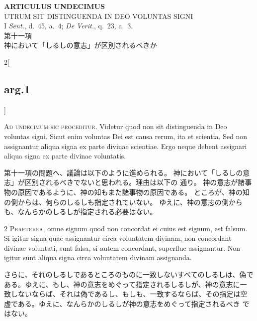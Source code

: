 \documentclass[paper=a4paper,fontsize=10pt,jafontsize=9pt,titlepage]{jlreq}
\begin{document}
{}
\setcounter{section}{11}
\setcounter{subsection}{0}
\begin{center}
 {\Large {\bfseries ARTICULUS UNDECIMUS}}\\
 {\large UTRUM SIT DISTINGUENDA IN DEO VOLUNTAS SIGNI}\\
 {\footnotesize I {\itshape Sent.}, d.~45, a.~4; {\itshape De Verit.},
 q.~23, a.~3.}\\
 {\Large 第十一項\\神において「しるしの意志」が区別されるべきか}
\end{center}

\begin{paracol}{2}[\subsection{arg.1}]


{\huge A}{\scshape d undecimum sic proceditur}. Videtur quod
non sit distinguenda in Deo voluntas signi. Sicut enim voluntas Dei est
causa rerum, ita et scientia. Sed non assignantur aliqua signa ex parte
divinae scientiae. Ergo neque debent assignari aliqua signa ex parte
divinae voluntatis.

\switchcolumn

第十一項の問題へ、議論は以下のように進められる。
神において「しるしの意志」が区別されるべきでないと思われる。理由は以下の
 通り。
神の意志が諸事物の原因であるように、神の知もまた諸事物の原因である。
ところが、神の知の側からは、何らのしるしも指定されていない。
ゆえに、神の意志の側からも、なんらかのしるしが指定される必要はない。



{\scshape 2 Praeterea}, omne signum quod non concordat
ei cuius est signum, est falsum. Si igitur signa quae assignantur circa
voluntatem divinam, non concordant divinae voluntati, sunt falsa, si
autem concordant, superflue assignantur. Non igitur sunt aliqua signa
circa voluntatem divinam assignanda.

\switchcolumn

さらに、それのしるしであるところのものに一致しないすべてのしるしは、偽で
 ある。ゆえに、もし、神の意志をめぐって指定されるしるしが、神の意志に一
 致しないならば、それは偽であるし、もしも、一致するならば、その指定は空
 虚である。ゆえに、なんらかのしるしが神の意志をめぐって指定されるべき
 ではない。


\end{paracol}
\end{document}
